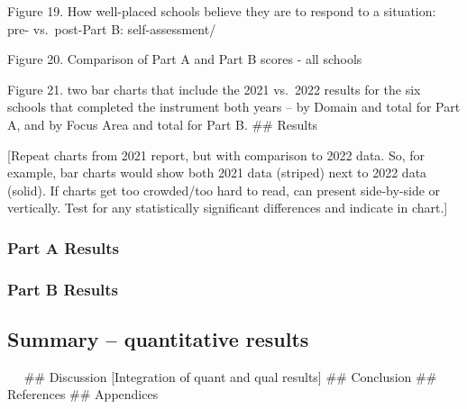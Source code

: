 \documentclass[
  letterpaper,
  DIV=11,
  numbers=noendperiod]{scrartcl}
\begin{document}
Figure 19. How well-placed schools believe they are to respond to a
situation: pre- vs.~post-Part B: self-assessment/

Figure 20. Comparison of Part A and Part B scores - all schools

Figure 21. two bar charts that include the 2021 vs.~2022 results for the
six schools that completed the instrument both years -- by Domain and
total for Part A, and by Focus Area and total for Part B. \#\# Results

{[}Repeat charts from 2021 report, but with comparison to 2022 data. So,
for example, bar charts would show both 2021 data (striped) next to 2022
data (solid). If charts get too crowded/too hard to read, can present
side-by-side or vertically. Test for any statistically significant
differences and indicate in chart.{]}

\hypertarget{part-a-results}{%
\subsubsection{Part A Results}\label{part-a-results}}

\hypertarget{part-b-results}{%
\subsubsection{Part B Results}\label{part-b-results}}

\hypertarget{summary-quantitative-results}{%
\subsection{Summary -- quantitative
results}\label{summary-quantitative-results}}

  \#\# Discussion {[}Integration of quant and qual results{]} \#\#
Conclusion \#\# References \#\# Appendices
\end{document}
